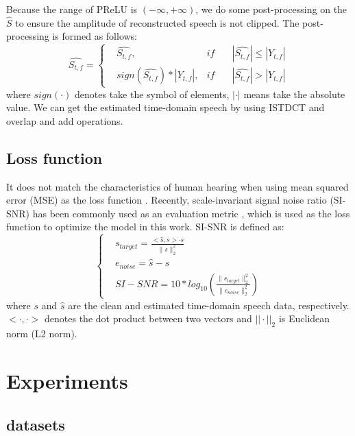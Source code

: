 \documentclass[journal,10pt]{IEEEtran}
\begin{document}
Because the range of PReLU is $(-\infty,+\infty)$, we do some post-processing on the $\widehat{S}$ to ensure the amplitude of reconstructed speech is not clipped. The post-processing is formed as follows:
\begin{equation}
\widehat{S_{t,f}}=\left\{
\begin{aligned}
& \widehat{S_{t,f}},& if & \quad |\widehat{S_{t,f}}| \leq |Y_{t,f}| \\
& sign(\widehat{S_{t,f}})*|Y_{t,f}|,& if & \quad |\widehat{S_{t,f}}| > |Y_{t,f}|
\end{aligned}
\right.
\end{equation}
where $sign(\cdot)$ denotes take the symbol of elements, $|\cdot|$ means take the absolute value. We can get the estimated time-domain speech by using ISTDCT and overlap and add operations.

\subsection{Loss function}

It does not match the characteristics of human hearing when using mean squared error (MSE) as the loss function \cite{shivakumar2016perception, liu2017perceptually, martin2018deep, kolbaek2018monaural}. Recently, scale-invariant signal noise ratio (SI-SNR) has been commonly used as an evaluation metric \cite{le2019sdr}, which is used as the loss function to optimize the model in this work. SI-SNR is defined as:
\begin{equation}\label{sisnr}
\left\{
\begin{aligned}
& s_{target}=\frac{<\widehat{s},s>\cdot s}{\|s\|_2^2} \\
& e_{noise}=\widehat{s} - s \\
& SI-SNR = 10*log_{10}(\frac{\|s_{target}\|_2^2}{\|e_{noise}\|_2^2})
\end{aligned}
\right.
\end{equation}
where $s$ and $\widehat{s}$ are the clean and estimated time-domain speech data, respectively. $<\cdot, \cdot>$ denotes the dot product between two vectors and $||\cdot||_2$ is Euclidean norm (L2 norm).

\section{Experiments}
\label{sec:experiments}
\subsection{datasets}
\end{document}

